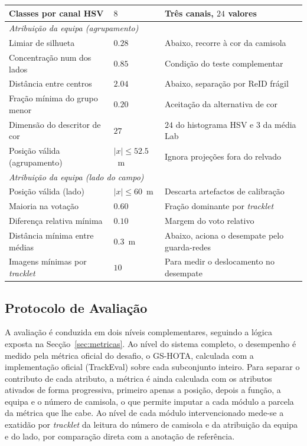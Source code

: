 \begin{table}[htbp]
\begin{tabular}{lll}
        Classes por canal HSV        & $8$             & Três canais, $24$ valores \\
        \hline
        \multicolumn{3}{l}{\emph{Atribuição da equipa (agrupamento)}} \\
        Limiar de silhueta           & $0.28$          & Abaixo, recorre à cor da camisola \\
        Concentração num dos lados   & $0.85$          & Condição do teste complementar \\
        Distância entre centros      & $2.04$          & Abaixo, separação por ReID frágil \\
        Fração mínima do grupo menor & $0.20$          & Aceitação da alternativa de cor \\
        Dimensão do descritor de cor & $27$            & $24$ do histograma HSV e $3$ da média Lab \\
        Posição válida (agrupamento) & $|x| \le 52.5$~m & Ignora projeções fora do relvado \\
        \hline
        \multicolumn{3}{l}{\emph{Atribuição da equipa (lado do campo)}} \\
        Posição válida (lado)        & $|x| \le 60$~m   & Descarta artefactos de calibração \\
        Maioria na votação           & $0.60$          & Fração dominante por \emph{tracklet} \\
        Diferença relativa mínima    & $0.10$          & Margem do voto relativo \\
        Distância mínima entre médias & $0.3$~m        & Abaixo, aciona o desempate pelo guarda-redes \\
        Imagens mínimas por \emph{tracklet} & $10$    & Para medir o deslocamento no desempate \\
        \hline
    \end{tabular}
\end{table}


\subsection{Protocolo de Avaliação}

A avaliação é conduzida em dois níveis complementares, seguindo a lógica exposta na
Secção~\ref{sec:metricas}. Ao nível do sistema completo, o desempenho é medido pela métrica oficial
do desafio, o GS-HOTA, calculada com a implementação oficial (TrackEval) sobre cada subconjunto
inteiro. Para separar o contributo de cada atributo, a métrica é ainda calculada com os atributos
ativados de forma progressiva, primeiro apenas a posição, depois a função, a equipa e o número de
camisola, o que permite imputar a cada módulo a parcela da métrica que lhe cabe. Ao nível de cada
módulo intervencionado mede-se a exatidão por \emph{tracklet} da leitura do número de camisola e da
atribuição da equipa e do lado, por comparação direta com a anotação de referência.

